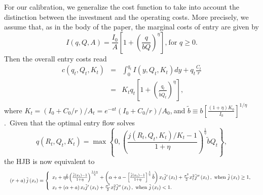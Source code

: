 \documentclass[12pt, a4paper]{article}
\begin{document}
For our
calibration, we generalize the cost function to take into account the
distinction between the investment and the operating costs. More precisely, we assume
that, as in the body of the paper, the marginal costs of entry are given by
\begin{equation*}
I\left( q,Q,A\right) =\frac{I_{0}}{A}\left[ 1+\left( \frac{q}{bQ}\right)
^{\eta }\right] \text{,}\ \text{for }q\geq 0\text{.}
\end{equation*}%
Then the overall entry costs read%
\begin{eqnarray*}
c\left( q_{t},Q_{t},K_{t}\right)  &=&\int_{0}^{q_{t}}I\left(
y,Q_{t},K_{t}\right) dy+q_{t}\frac{C_{t}}{r} \\
&=&K_{t}q_{t}\left[ 1+\left( \frac{q_{t}}{\tilde{b}Q_{t}}\right) ^{\eta }%
\right] ,
\end{eqnarray*}%
where $K_{t}=\left( I_{0}+C_{0}/r\right) /A_{t}=e^{-at}\left(
I_{0}+C_{0}/r\right) /A_{0}$,$\ $and $\tilde{b}\equiv b\left[ \frac{\left(
1+\eta \right) K_{0}}{I_{0}}\right] ^{1/\eta }$.\ Given that the optimal
entry flow solves%
\begin{equation*}
q\left( R_{t},Q_{t},K_{t}\right) =\max \left\{ 0,\left( \frac{j\left(
R_{t},Q_{t},K_{t}\right) /K_{t}-1}{1+\eta }\right) ^{\frac{1}{\eta }}\tilde{b%
}Q_{t}\right\} ,
\end{equation*}%
the HJB is now equivalent to
\begin{equation}
\resizebox{\textwidth}{!}
{$
\left( r+a\right) \tilde{j}\left( x_{t}\right) =\left\{
\begin{array}{l}
x_{t}+\eta \tilde{b} \left( \frac{\tilde{j}\left( x_{t}\right) -1}{1+\eta }\right) ^{%
\frac{1+\eta }{\eta }}+\left( \alpha +a-\left[ \frac{\tilde{j}\left(
x_{t}\right) -1}{1+\eta }\right] ^{\frac{1}{\eta }}\tilde{b}\right) x_{t}%
\tilde{j}^{\prime }\left( x_{t}\right) +\frac{\sigma ^{2}}{2}x_{t}^{2}\tilde{%
j}^{\prime \prime }\left( x_{t}\right) ,\ \text{when }\tilde{j}\left(
x_{t}\right) \geq 1, \\
x_{t}+\left( \alpha +a\right) x_{t}\tilde{j}^{\prime }\left( x_{t}\right) +%
\frac{\sigma ^{2}}{2}x_{t}^{2}\tilde{j}^{\prime \prime }\left( x_{t}\right)
,\ \text{when }\tilde{j}\left( x_{t}\right) <1.%
\end{array}%
\right.
$}
\label{eq:HJB_normalized}
\end{equation}
\end{document}
